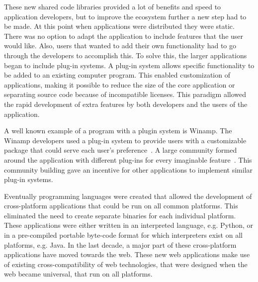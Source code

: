 
These new shared code libraries provided a lot of benefits and speed to application developers, but to improve the ecosystem further a new step had to be made. At this point when applications were distributed they were static. There was no option to adapt the application to include features that the user would like. Also, users that wanted to add their own functionality had to go through the developers to accomplish this. To solve this, the larger applications began to include plug-in systems. A plug-in system allows specific functionality to be added to an existing computer program. This enabled customization of applications, making it possible to reduce the size of the core application or separating source code because of incompatible licenses. This paradigm allowed the rapid development of extra features by both developers and the users of the application.

A well known example of a program with a plugin system is Winamp. The Winamp developers used a plug-in system to provide users with a customizable package that could serve each user's preference~\cite{nullsoft1999winamp}. A large community formed around the application with different plug-ins for every imaginable feature~\cite{winampcommunity}. This community building gave an incentive for other applications to implement similar plug-in systems.

Eventually programming languages were created that allowed the development of cross-platform applications that could be run on all common platforms. This eliminated the need to create separate binaries for each individual platform. These applications were either written in an interpreted language, e.g. Python, or in a pre-compiled portable byte-code format for which interpreters exist on all platforms, e.g. Java. In the last decade, a major part of these cross-platform applications have moved towards the web. These new web applications make use of existing cross-compatibility of web technologies, that were designed when the web became universal, that run on all platforms.

